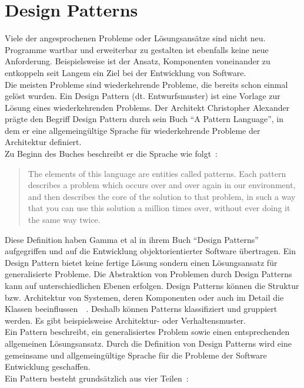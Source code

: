 \section{Design Patterns}
Viele der angesprochenen Probleme oder Lösungsansätze sind nicht neu. Programme wartbar und erweiterbar zu gestalten ist ebenfalls keine neue Anforderung. Beispielsweise ist der Ansatz, Komponenten voneinander zu entkoppeln seit Langem ein Ziel bei der Entwicklung von Software.\\
Die meisten Probleme sind wiederkehrende Probleme, die bereits schon einmal gelöst wurden. Ein Design Pattern (dt. Entwurfsmuster) ist eine Vorlage zur Lösung eines wiederkehrenden Problems. Der Architekt Christopher Alexander prägte den Begriff Design Pattern durch sein Buch \enquote{A Pattern Language}, in dem er eine allgemeingültige Sprache für wiederkehrende Probleme der Architektur definiert.\\
Zu Beginn des Buches beschreibt er die Sprache wie folgt~\cite[S. \textit{x}]{alexander_pattern_1977}:

\begin{quotation}
The elements of this language are entities called patterns. Each pattern describes a problem which occurs over and over again in our environment, and then describes the core of the solution to that problem, in such a way that you can use this solution a million times over, without ever doing it the same way twice.
\end{quotation}

Diese Definition haben Gamma et al in ihrem Buch \enquote{Design Patterns} aufgegriffen und auf die Entwicklung objektorientierter Software übertragen. Ein Design Pattern bietet keine fertige Lösung sondern einen Lösungsansatz für generalisierte Probleme. Die Abstraktion von Problemen durch Design Patterns kann auf unterschiedlichen Ebenen erfolgen. Design Patterns können die Struktur bzw. Architektur von Systemen, deren Komponenten oder auch im Detail die Klassen beeinflussen~\cite[S.~3]{gamma_design_1995}~\cite[S.~127]{douglass_real-time_2003}. Deshalb können Patterns klassifiziert und gruppiert werden. Es gibt beispielsweise Architektur- oder Verhaltensmuster.\\
Ein Pattern beschreibt, ein generalisiertes Problem sowie einen entsprechenden allgemeinen Lösungsansatz. Durch die Definition von Design Patterns wird eine gemeinsame und allgemeingültige Sprache für die Probleme der Software Entwicklung geschaffen.\\
Ein Pattern besteht grundsätzlich aus vier Teilen~\cite[S.~3]{gamma_design_1995}:

